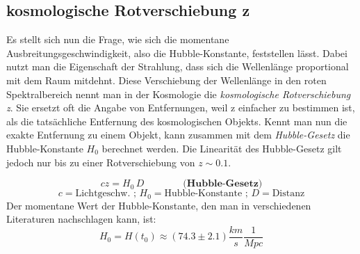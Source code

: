 \begin{refsection}
\subsection{kosmologische Rotverschiebung z}
Es stellt sich nun die Frage, wie sich die momentane Ausbreitungsgeschwindigkeit, also die Hubble-Konstante, feststellen lässt. Dabei nutzt man die Eigenschaft der Strahlung, dass sich die Wellenlänge proportional mit dem Raum mitdehnt. Diese Verschiebung der Wellenlänge in den roten Spektralbereich nennt man in der Kosmologie die \textit{kosmologische Rotverschiebung z}. Sie ersetzt oft die Angabe von Entfernungen, weil z einfacher zu bestimmen ist, als die tatsächliche Entfernung des kosmologischen Objekts. 
Kennt man nun die exakte Entfernung zu einem Objekt, kann zusammen mit dem \textit{Hubble-Gesetz} die Hubble-Konstante $H_0$ berechnet werden. Die Linearität des Hubble-Gesetz gilt jedoch nur bis zu einer Rotverschiebung von $z \sim 0.1$.

\[ cz = H_0 \, D \qquad \qquad \textbf{(Hubble-Gesetz)} \]
\[c = \text{Lichtgeschw. ; } H_0 = \text{Hubble-Konstante ; } D = \text{Distanz} \]
Der momentane Wert der Hubble-Konstante, den man in verschiedenen Literaturen nachschlagen kann, ist:
\[ H_0 = H(t_0) \approx (74.3 \pm 2.1) \frac{km}{s}\frac{1}{Mpc}\]

\end{refsection}
